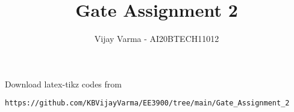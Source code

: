 \documentclass[journal,12pt,twocolumn]{IEEEtran}
\DeclareMathOperator*{\Res}{Res}
\begin{document}
\newcommand{\BEQA}{\begin{eqnarray}}
\newcommand{\EEQA}{\end{eqnarray}}
\newcommand{\define}{\stackrel{\triangle}{=}}

\raggedbottom
\setlength{\parindent}{0pt}
\providecommand{\mbf}{\mathbf}
\providecommand{\pr}[1]{\ensuremath{\Pr\left(#1\right)}}
\providecommand{\qfunc}[1]{\ensuremath{Q\left(#1\right)}}
\providecommand{\sbrak}[1]{\ensuremath{{}\left[#1\right]}}
\providecommand{\lsbrak}[1]{\ensuremath{{}\left[#1\right.}}
\providecommand{\rsbrak}[1]{\ensuremath{{}\left.#1\right]}}
\providecommand{\brak}[1]{\ensuremath{\left(#1\right)}}
\providecommand{\lbrak}[1]{\ensuremath{\left(#1\right.}}
\providecommand{\rbrak}[1]{\ensuremath{\left.#1\right)}}
\providecommand{\cbrak}[1]{\ensuremath{\left\{#1\right\}}}
\providecommand{\lcbrak}[1]{\ensuremath{\left\{#1\right.}}
\providecommand{\rcbrak}[1]{\ensuremath{\left.#1\right\}}}
\theoremstyle{remark}
\newtheorem{rem}{Remark}
\newcommand{\sgn}{\mathop{\mathrm{sgn}}}
\providecommand{\abs}[1]{\vert#1\vert}
\providecommand{\res}[1]{\Res\displaylimits_{#1}} 
\providecommand{\norm}[1]{\lVert#1\rVert}
\providecommand{\mtx}[1]{\mathbf{#1}}
\providecommand{\mean}[1]{E[ #1 ]}
\providecommand{\fourier}{\overset{\mathcal{F}}{ \rightleftharpoons}}
\providecommand{\system}{\overset{\mathcal{H}}{ \longleftrightarrow}}
\newcommand{\solution}{\noindent \textbf{Solution: }}
\newcommand{\cosec}{\,\text{cosec}\,}
\providecommand{\dec}[2]{\ensuremath{\overset{#1}{\underset{#2}{\gtrless}}}}
\newcommand{\myvec}[1]{\ensuremath{\begin{pmatrix}#1\end{pmatrix}}}
\newcommand{\mydet}[1]{\ensuremath{\begin{vmatrix}#1\end{vmatrix}}}
\makeatletter
{}
\makeatother
\let\StandardTheFigure\thefigure
\let\vec\mathbf
\renewcommand{\thefigure}{\theproblem}
\def\putbox#1#2#3{\makebox[0in][l]{\makebox[#1][l]{}\raisebox{\baselineskip}[0in][0in]{\raisebox{#2}[0in][0in]{#3}}}}
     \def\rightbox#1{\makebox[0in][r]{#1}}
     \def\centbox#1{\makebox[0in]{#1}}
     \def\topbox#1{\raisebox{-\baselineskip}[0in][0in]{#1}}
     \def\midbox#1{\raisebox{-0.5\baselineskip}[0in][0in]{#1}}
\vspace{3cm}
\title{Gate Assignment 2}
\author{Vijay Varma - AI20BTECH11012}
\maketitle
\newpage
\bigskip
\renewcommand{\thefigure}{\theenumi}
\renewcommand{\thetable}{\theenumi}
%
Download latex-tikz codes from 
%
\begin{lstlisting}
https://github.com/KBVijayVarma/EE3900/tree/main/Gate_Assignment_2
\end{lstlisting}
%
\end{document}
